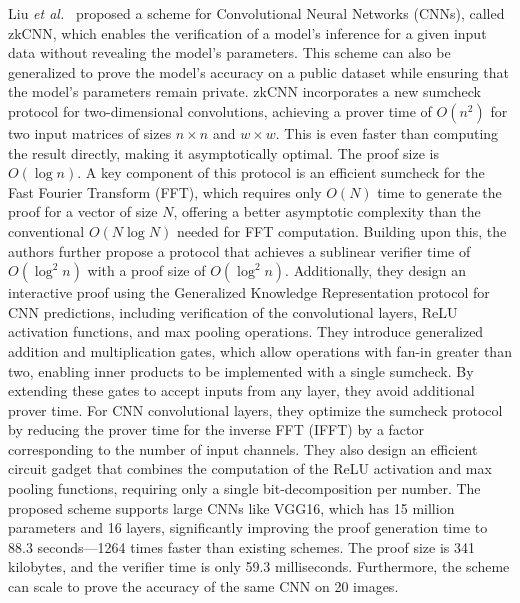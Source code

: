 \documentclass[journal]{IEEEtran}
\begin{document}
Liu \textit{et al.}~\cite{liu2021zkcnn} proposed a scheme for Convolutional Neural Networks (CNNs), called zkCNN, which enables the verification of a model's inference for a given input data without revealing the model's parameters. This scheme can also be generalized to prove the model's accuracy on a public dataset while ensuring that the model's parameters remain private. zkCNN incorporates a new sumcheck protocol for two-dimensional convolutions, achieving a prover time of $O(n^2)$ for two input matrices of sizes $n \times n$ and $w \times w$. This is even faster than computing the result directly, making it asymptotically optimal. The proof size is $O(\log n)$. A key component of this protocol is an efficient sumcheck for the Fast Fourier Transform (FFT), which requires only $O(N)$ time to generate the proof for a vector of size $N$, offering a better asymptotic complexity than the conventional $O(N \log N)$ needed for FFT computation. Building upon this, the authors further propose a protocol that achieves a sublinear verifier time of $O(\log^2 n)$ with a proof size of $O(\log^2 n)$. Additionally, they design an interactive proof using the Generalized Knowledge Representation protocol for CNN predictions, including verification of the convolutional layers, ReLU activation functions, and max pooling operations. They introduce generalized addition and multiplication gates, which allow operations with fan-in greater than two, enabling inner products to be implemented with a single sumcheck. By extending these gates to accept inputs from any layer, they avoid additional prover time. For CNN convolutional layers, they optimize the sumcheck protocol by reducing the prover time for the inverse FFT (IFFT) by a factor corresponding to the number of input channels. They also design an efficient circuit gadget that combines the computation of the ReLU activation and max pooling functions, requiring only a single bit-decomposition per number. The proposed scheme supports large CNNs like VGG16, which has 15 million parameters and 16 layers, significantly improving the proof generation time to 88.3 seconds---1264 times faster than existing schemes. The proof size is 341 kilobytes, and the verifier time is only 59.3 milliseconds. Furthermore, the scheme can scale to prove the accuracy of the same CNN on 20 images.
\end{document}
